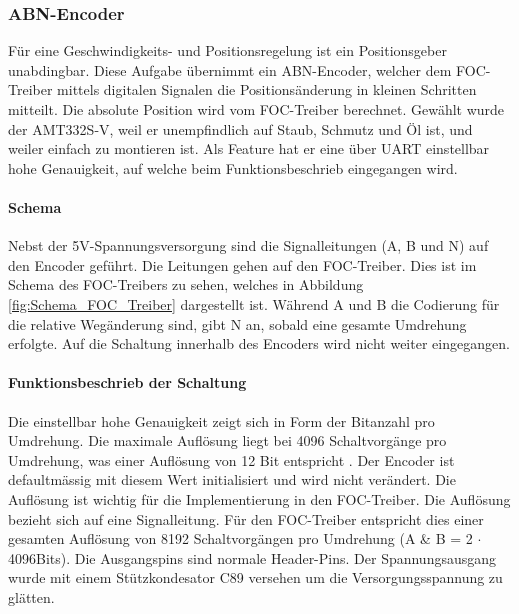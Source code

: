 \subsubsection{ABN-Encoder}
\label{subsubsec:ABN-Encoder}

Für eine Geschwindigkeits- und Positionsregelung ist ein Positionsgeber unabdingbar. Diese Aufgabe übernimmt ein ABN-Encoder, welcher dem FOC-Treiber mittels digitalen Signalen die Positionsänderung in kleinen Schritten mitteilt. Die absolute Position wird vom FOC-Treiber berechnet. Gewählt wurde der AMT332S-V, weil er unempfindlich auf Staub, Schmutz und Öl ist, und weiler einfach zu montieren ist. Als Feature hat er eine über UART einstellbar hohe Genauigkeit, auf welche beim Funktionsbeschrieb eingegangen wird.

\paragraph{Schema}\mbox{}

Nebst der 5V-Spannungsversorgung sind die Signalleitungen (A, B und N) auf den Encoder geführt. Die Leitungen gehen auf den FOC-Treiber. Dies ist im Schema des FOC-Treibers zu sehen, welches in Abbildung \ref{fig:Schema_FOC_Treiber} dargestellt ist. Während A und B die Codierung für die relative Wegänderung sind, gibt N an, sobald eine gesamte Umdrehung erfolgte. Auf die Schaltung innerhalb des Encoders wird nicht weiter eingegangen.

\paragraph{Funktionsbeschrieb der Schaltung}\mbox{}

Die einstellbar hohe Genauigkeit zeigt sich in Form der Bitanzahl pro Umdrehung. Die maximale Auflösung liegt bei 4096 Schaltvorgänge pro Umdrehung, was einer Auflösung von 12 Bit entspricht \cite[S.1]{cui_devices_cui_2019}. Der Encoder ist defaultmässig mit diesem Wert initialisiert und wird nicht verändert. Die Auflösung ist wichtig für die Implementierung in den FOC-Treiber. Die Auflösung bezieht sich auf eine Signalleitung. Für den FOC-Treiber entspricht dies einer gesamten Auflösung von 8192 Schaltvorgängen pro Umdrehung (A \& B = 2 $\cdot$ 4096Bits). Die Ausgangspins sind normale Header-Pins. Der Spannungsausgang wurde mit einem Stützkondesator C89 versehen um die Versorgungsspannung zu glätten.

